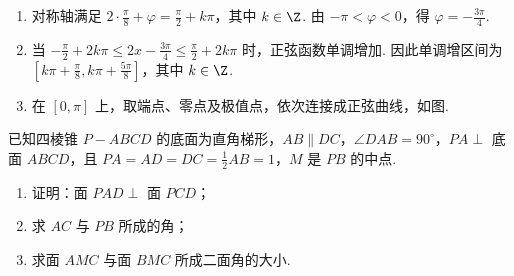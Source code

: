 \begin{solution}
\begin{enumerate}
\item 对称轴满足 \(2\cdot\frac{\pi}{8}+\varphi=\frac{\pi}{2}+k\pi\)，其中 \(k\in\Z\). 由 \(-\pi<\varphi<0\)，得 \(\varphi=-\frac{3\pi}{4}\).
\item 当 \(-\frac{\pi}{2}+2k\pi\leqslant 2x-\frac{3\pi}{4}\leqslant\frac{\pi}{2}+2k\pi\) 时，正弦函数单调增加. 因此单调增区间为 \(\left[k\pi+\frac\pi8,k\pi+\frac{5\pi}8\right]\)，其中 \(k\in\Z\).
\item 在 \([0,\pi]\) 上，取端点、零点及极值点，依次连接成正弦曲线，如图.
\begin{center}
\end{center}
\end{enumerate}
\end{solution}

\begin{problem}
已知四棱锥 \(P-ABCD\) 的底面为直角梯形，\(AB\parallel DC\)，\(\angle DAB=90^{\circ}\)，\(PA\perp\) 底面 \(ABCD\)，且 \(PA=AD=DC=\frac{1}{2}AB=1\)，\(M\) 是 \(PB\) 的中点.

\begin{enumerate}
\item 证明：面 \(PAD\perp\) 面 \(PCD\)；
\item 求 \(AC\) 与 \(PB\) 所成的角；
\item 求面 \(AMC\) 与面 \(BMC\) 所成二面角的大小.
\end{enumerate}

\begin{center}
\end{center}
\end{problem}

